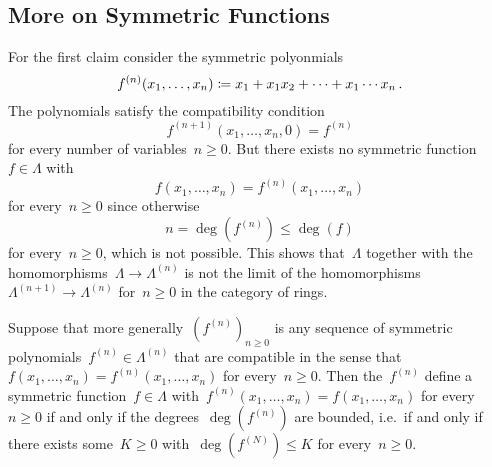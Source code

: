\documentclass[a4paper,11pt]{scrartcl}
\begin{document}
%
%



\subsection{More on Symmetric Functions}
\label{wrong symmetric functions}

For the first claim consider the symmetric polyonmials
\[
  f^{ (n) }(x_1, \dotsc, x_n)
  \coloneqq
  x_1 + x_1 x_2 + \dotsb + x_1 \dotsm x_n \,.
\]
The polynomials satisfy the compatibility condition
\[
  f^{(n+1)}(x_1, \dotsc, x_n, 0)
  =
  f^{(n)}
\]
for every number of variables~$n \geq 0$.
But there exists no symmetric function~$f \in \Lambda$ with
\[
  f(x_1, \dotsc, x_n) = f^{(n)}(x_1, \dotsc, x_n)
\]
for every~$n \geq 0$ since otherwise
\[
  n
  =
  \deg(f^{(n)})
  \leq
  \deg(f)
\]
for every~$n \geq 0$, which is not possible.
This shows that~$\Lambda$ together with the homomorphisms~$\Lambda \to \Lambda^{(n)}$ is not the limit of the homomorphisms~$\Lambda^{(n+1)} \to \Lambda^{(n)}$ for~$n \geq 0$ in the category of rings.

Suppose that more generally~$( f^{(n)} )_{n \geq 0}$ is any sequence of symmetric polynomials~$f^{(n)} \in \Lambda^{(n)}$ that are compatible in the sense that~$f(x_1, \dotsc, x_n) = f^{(n)}(x_1, \dotsc, x_n)$ for every~$n \geq 0$.
Then the~$f^{(n)}$ define a symmetric function~$f \in \Lambda$ with~$f^{(n)}(x_1, \dotsc, x_n) = f(x_1, \dotsc, x_n)$ for every~$n \geq 0$ if and only if the degrees~$\deg( f^{(n)} )$ are bounded, i.e.\ if and only if there exists some~$K \geq 0$ with~$\deg( f^{(N)} ) \leq K$ for every~$n \geq 0$.
\end{document}
